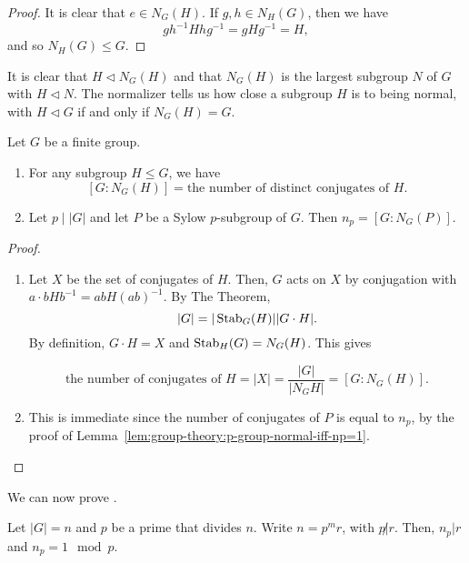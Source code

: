 \begin{proof}
  It is clear that \(e \in N_{G}(H)\). If \(g,h \in N_{H}(G)\), then we have
  \[gh^{-1}H hg^{-1} = gHg^{-1} = H,\]
  and so \(N_{H}(G) \leq G\).
\end{proof}

It is clear that \(H \triangleleft N_{G}(H)\) and that \(N_{G}(H)\) is the largest subgroup \(N\) of \(G\) with \(H \triangleleft N\). The normalizer tells us how close a subgroup \(H\) is to being normal, with \(H \triangleleft G\) if and only if \(N_{G}(H) = G\).

\begin{lemma}
  Let \(G\) be a finite group.

  \begin{enumerate}
    \item For any subgroup \(H \leq G\), we have
      \[[G:N_{G}(H)] = \text{the number of distinct conjugates of } H.\]
    \item Let \(p \mid |G|\) and let \(P\) be a Sylow \(p\)-subgroup of \(G\). Then \(n_{p} = [G:N_{G}(P)]\).
    \end{enumerate}
\end{lemma}

\begin{proof}
  \begin{enumerate}
  \item Let \(X\) be the set of conjugates of \(H\). Then, \(G\) acts on \(X\) by conjugation with \(a \cdot bHb^{-1} = abH(ab)^{-1}\). By The  Theorem,
    \[|G| = |\operatorname{Stab}_{G}(H)| |G\cdot H|.\]
    By definition, \(G \cdot H = X\) and \(\operatorname{Stab}_{H}(G) = N_{G}(H)\). This gives

    \[\text{the number of conjugates of } H = |X| = \frac{|G|}{|N_{G}H|} = [G : N_{G}(H)].\]

  \item This is immediate since the number of conjugates of \(P\) is equal to \(n_{p}\), by the proof of Lemma~\ref{lem:group-theory:p-group-normal-iff-np=1}.
  \end{enumerate}
\end{proof}

We can now prove .

\begin{theorem}[Sylow 3]\label{thm:group-theory:Sylow-3}
  Let \(|G| = n\) and \(p\) be a prime that divides \(n\). Write \(n = p^{m}r\), with \(p \not| r\). Then, \(n_{p} | r\) and \(n_{p} = 1 \mod p\).
\end{theorem}

